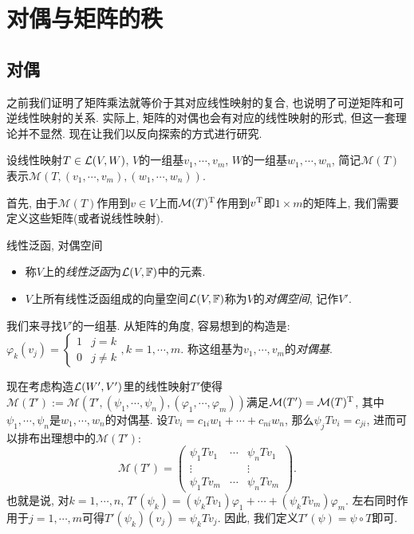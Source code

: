 \newpage
\section{对偶与矩阵的秩}

\subsection{对偶}

之前我们证明了矩阵乘法就等价于其对应线性映射的复合, 也说明了可逆矩阵和可逆线性映射的关系. 实际上, 矩阵的对偶也会有对应的线性映射的形式, 但这一套理论并不显然. 现在让我们以反向探索的方式进行研究. 

设线性映射$T \in \mathcal{L} (V,W)$, $V$的一组基$v_1,\cdots ,v_m$, $W$的一组基$w_1,\cdots ,w_n$, 简记$\mathcal{M}(T)$表示$\mathcal{M}(T, (v_1,\cdots ,v_m), (w_1,\cdots ,w_n))$. 

首先, 由于$\mathcal{M}(T)$作用到$v \in V$上而$\mathcal{M}(T)^{\operatorname{T}}$作用到$v^{\operatorname{T}}$即$1\times m$的矩阵上, 我们需要定义这些矩阵(或者说线性映射). 

\begin{definition}{线性泛函, 对偶空间}
	\vspace{-2em}
	\begin{itemize}
		\item 称$V$上的\textit{线性泛函}为$\mathcal{L} (V,\mathbb{F})$中的元素. 
		\item $V$上所有线性泛函组成的向量空间$\mathcal{L} (V,\mathbb{F})$称为$V$的\textit{对偶空间}, 记作$V'$. 
	\end{itemize}
\end{definition}

我们来寻找$V'$的一组基. 从矩阵的角度, 容易想到的构造是: $\varphi _k(v_j) = \begin{cases} 1 & j=k \\ 0 & j \neq k \end{cases}, k=1,\cdots ,m$. 称这组基为$v_1,\cdots ,v_m$的\textit{对偶基}. 

现在考虑构造$\mathcal{L} (W',V')$里的线性映射$T'$使得$\mathcal{M}(T'):= \mathcal{M}(T',(\psi _1,\cdots ,\psi _n), (\varphi _1,\cdots ,\varphi _m))$满足$\mathcal{M}(T') = \mathcal{M}(T)^{\operatorname{T}}$, 其中$\psi _1,\cdots ,\psi _n$是$w_1,\cdots ,w_n$的对偶基. 设$Tv_i = c_{1i} w_1 + \cdots + c_{ni} w_n$, 那么$\psi _j Tv_i = c_{ji}$, 进而可以排布出理想中的$\mathcal{M}(T')$: $$\mathcal{M}(T') = \begin{pmatrix}
 \psi _1Tv_1 & \cdots & \psi _nTv_1 \\
 \vdots &  & \vdots \\
 \psi _1Tv_m & \cdots & \psi _nTv_m
\end{pmatrix}. $$
也就是说, 对$k=1,\cdots ,n$, $T'(\psi _k) = (\psi _kTv_1)\varphi _1 + \cdots + (\psi _kTv_m)\varphi _m$. 左右同时作用于$j=1,\cdots ,m$可得$T'(\psi _k)(v_j) = \psi _k Tv_j$. 因此, 我们定义$T'(\psi) = \psi \circ T$即可. 

